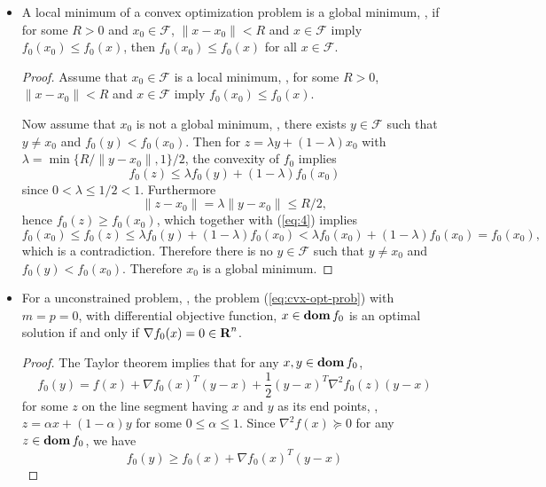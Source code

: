\documentclass[10pt, twoside]{book}   	%
\newcommand{\feasibleset}{\mathcal{F}}
\newcommand{\grad}{\nabla}
\begin{document}
\begin{itemize}
\item A local minimum of a convex optimization problem is a global minimum,
\ie,
if for some $R>0$ and $x_0\in\feasibleset$, $\|x-x_0\|<R$ and $x\in\feasibleset$ imply $f_0(x_0) \leq f_0(x)$,
then $f_0(x_0) \leq f_0(x)$ for all $x\in\feasibleset$.
\begin{proof}
Assume that $x_0\in\feasibleset$ is a local minimum, \ie,
for some $R>0$, $\|x-x_0\|<R$ and $x\in\feasibleset$ imply $f_0(x_0) \leq f_0(x)$.

Now assume that $x_0$ is not a global minimum, \ie, there exists $y\in\feasibleset$
such that $y\neq x_0$ and $f_0(y) < f_0(x_0)$.
Then for $z = \lambda y + (1-\lambda) x_0$ with $\lambda = \min\{ R/\|y-x_0\|, 1\}/2$,
the convexity of $f_0$ implies
\begin{equation}
\label{eq:4}
f_0(z) \leq \lambda f_0(y) + (1-\lambda) f_0(x_0)
\end{equation}
since $0 < \lambda \leq 1/2 < 1$.
Furthermore
\begin{equation}
\|z - x_0\| = \lambda \|y-x_0\| \leq R/2,
\end{equation}
hence $f_0(z) \geq f_0(x_0)$, which together with (\ref{eq:4}) implies
\begin{equation}
f_0(x_0) \leq f_0(z)
\leq \lambda f_0(y) + (1-\lambda) f_0(x_0)
< \lambda f_0(x_0) + (1-\lambda) f_0(x_0)
= f_0(x_0),
\end{equation}
which is a contradiction.
Therefore there is no $y\in\feasibleset$ such that $y\neq x_0$ and $f_0(y) < f_0(x_0)$.
Therefore $x_0$ is a global minimum.
\end{proof}



\item For a unconstrained problem, \ie, the problem (\ref{eq:cvx-opt-prob}) with $m=p=0$, with differential objective function,
$x\in\mathop{\bf dom} f_0$ is an optimal solution if and only if $\grad f_0(x)= 0 \in \reals^n$.

\begin{proof}
The Taylor theorem implies that for any $x,y\in\mathop{\bf dom} f_0$,
\begin{equation}
\label{eq:second-order-taylor}
f_0(y) = f(x) + \grad f_0(x) ^T (y-x) + \frac{1}{2} (y-x)^T \grad^2 f_0(z) (y-x)
\end{equation}
for some $z$ on the line segment having $x$ and $y$ as its end points,
\ie, $z = \alpha x + (1-\alpha) y$ for some $0\leq \alpha \leq 1$.
Since $\grad^2 f(x) \succeq0$ for any $z \in \mathop{\bf dom} f_0$, we have
\begin{equation}
f_0(y) \geq f_0(x) + \grad f_0(x) ^T (y-x)
\end{equation}


\end{proof}
\end{itemize}
\end{document}
